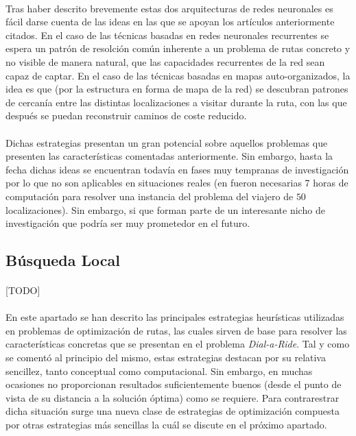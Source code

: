 \documentclass{subfiles}
\begin{document}
        \paragraph{}
        Tras haber descrito brevemente estas dos arquitecturas de redes neuronales es fácil darse cuenta de las ideas en las que se apoyan los artículos anteriormente citados. En el caso de las técnicas basadas en redes neuronales recurrentes se espera  un patrón de resolción común inherente a un problema de rutas concreto y no visible de manera natural, que las capacidades recurrentes de la red sean capaz de captar. En el caso de las técnicas basadas en mapas auto-organizados, la idea es que (por la estructura en forma de mapa de la red) se descubran patrones de cercanía entre las distintas localizaciones a visitar durante la ruta, con las que después se puedan reconstruir caminos de coste reducido.

        \paragraph{}
        Dichas estrategias presentan un gran potencial sobre aquellos problemas que presenten las características comentadas anteriormente. Sin embargo, hasta la fecha dichas ideas se encuentran todavía en fases muy tempranas de investigación por lo que no son aplicables en situaciones reales (en \cite{bello2016neural} fueron necesarias 7 horas de computación para resolver una instancia del problema del viajero de $50$ localizaciones). Sin embargo, si que forman parte de un interesante nicho de investigación que podría ser muy prometedor en el futuro.

      \subsection{Búsqueda Local}
      \label{sec:solving_local_search}

        \paragraph{}
        [TODO]

      \paragraph{}
      En este apartado se han descrito las principales estrategias heurísticas utilizadas en problemas de optimización de rutas, las cuales sirven de base para resolver las características concretas que se presentan en el problema \emph{Dial-a-Ride}. Tal y como se comentó al principio del mismo, estas estrategias destacan por su relativa sencillez, tanto conceptual como computacional. Sin embargo, en muchas ocasiones no proporcionan resultados suficientemente buenos (desde el punto de vista de su distancia a la solución óptima) como se requiere. Para contrarestrar dicha situación surge una nueva clase de estrategias de optimización compuesta por otras estrategias más sencillas la cuál se discute en el próximo apartado.
\end{document}
